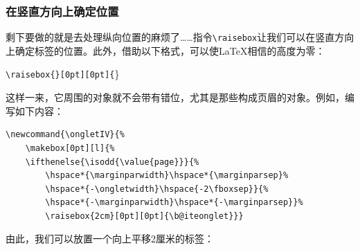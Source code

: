 \subsubsection{在竖直方向上确定位置}

剩下要做的就是去处理纵向位置的麻烦了……指令\verb|\raisebox|让我们可以在竖直方向上确定标签的位置。此外，借助以下格式，可以使\LaTeX 相信的高度为零：

\begin{dmd}
\verb|\raisebox{|\verb|}[0pt][0pt]{|\}
\end{dmd}

这样一来，它周围的对象就不会带有错位，尤其是那些构成页眉的对象。例如，编写如下内容：

\begin{dmd}
\begin{verbatim}
\newcommand{\ongletIV}{% 
    \makebox[0pt][l]{% 
    \ifthenelse{\isodd{\value{page}}}{%
        \hspace*{\marginparwidth}\hspace*{\marginparsep}% 
        \hspace*{-\ongletwidth}\hspace{-2\fboxsep}}{% 
        \hspace*{-\marginparwidth}\hspace*{-\marginparsep}}% 
        \raisebox{2cm}[0pt][0pt]{\b@iteonglet}}}
\end{verbatim}
\end{dmd}

由此，我们可以放置一个向上平移2厘米的标签：

\newcommand{\ongletIV}{%
    \makebox[0pt][l]{%
    \ifthenelse{\isodd{\value{page}}}{%
        \hspace*{\marginparwidth}\hspace*{\marginparsep}%
        \hspace*{-\ongletwidth}\hspace{-2\fboxsep}}{%
        \hspace*{-\marginparwidth}\hspace*{-\marginparsep}}%
        \raisebox{2cm}[0pt][0pt]{\biteonglet}}}

\ifthenelse{\isodd{\value{page}}}{%
  \begin{flushright}
    \bfseries\thepage\ongletIV\\[-10pt]
    \rule{\textwidth}{.4pt}
  \end{flushright}}{%
  \begin{flushleft}
  \ongletIV\bfseries\thepage\\[-10pt]
    \rule{\textwidth}{.4pt}
  \end{flushleft}}

